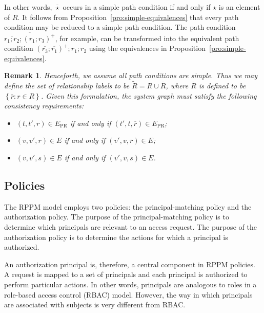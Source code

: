 \documentclass{article}
\newtheorem{remark}{Remark}
\newcommand{\set}[1]{\ensuremath{\left\{#1\right\}}} \newcommand{\setO}[1]{\ensuremath{\left\{#1\right.}} \newcommand{\setC}[1]{\ensuremath{\left.#1\right\}}} \newcommand{\setN}[1]{\ensuremath{\left.#1\right.}} \newcommand{\sett}[1]{\ensuremath{\left\{\textit{#1}\right\}}} \newcommand{\tuple}[1]{\ensuremath{\left(#1\right)}} \newcommand{\tuplet}[1]{\ensuremath{\left(\textit{#1}\right)}} \newcommand{\card}[1]{\left| #1 \right|}
\newcommand{\RcoR}{\ensuremath{\widetilde{R}}} \newcommand{\entity}[1]{\ensuremath{#1}} \newcommand{\rel}[1]{\ensuremath{#1}} \newcommand{\relw}[1]{\textsf{#1}} \newcommand{\comp}{\mathbin{;}} \newcommand{\relpc}[1]{\textsf{#1}} \newcommand{\princ}[1]{\textsf{#1}} \newcommand{\ppmc}{\ensuremath{\phi}} \newcommand{\npmc}{\ensuremath{\psi}} \newcommand{\pmp}{\ensuremath{\rho}} \newcommand{\act}[1]{\textsf{#1}} \newcommand{\crs}{\ensuremath{\chi}} \newcommand{\crso}[1]{\textsf{#1}} \newcommand{\defo}[1]{#1} \newcommand{\mpalg}{\textsf{MatchPrincipal}\xspace} \renewcommand{\algorithmiccomment}[1]{// #1} \newcommand{\audita}[1]{\ensuremath{#1^\oplus}}
\begin{document}
In other words, $\overline{\star}$ occurs in a simple path condition if and only if $\star$ is an element of $R$.
It follows from Proposition~\ref{pro:simple-equivalences} that every path condition may be reduced to a simple path condition.
The path condition $\overline{\overline{r_1 \comp r_2} \comp (r_1 \comp r_3)^+}$, for example, can be transformed into the equivalent path condition $(\overline{r_3} \comp \overline{r_1})^+ \comp r_1 \comp r_2$ using the equivalences in Proposition~\ref{pro:simple-equivalences}.

\begin{remark}\label{rem:r-includes-rbar}
    Henceforth, we assume all path conditions are simple.
    Thus we may define the set of relationship labels to be $\RcoR = R \cup \overline{R}$, where $\overline{R}$ is defined to be $\set{\overline{r} : r \in R}$.
    Given this formulation, the system graph must satisfy the following consistency requirements:
    \begin{itemize}
     \item $(t,t',r) \in E_{\textrm{PR}}$ if and only if $(t',t,\overline{r}) \in E_{\textrm{PR}}$;
     \item $(v,v',r) \in E$ if and only if $(v',v,\overline{r}) \in E$;
     \item $(v,v',s) \in E$ if and only if $(v',v,s) \in E$.
    \end{itemize}
\end{remark}

\subsection{Policies}\label{sec:model:policies}

\newcommand{\all}{\mathsf{all}}
\newcommand{\none}{\mathsf{none}}

The RPPM model employs two policies: the principal-matching policy and the authorization policy.
The purpose of the principal-matching policy is to determine which principals are relevant to an access request.
The purpose of the authorization policy is to determine the actions for which a principal is authorized.

An authorization principal is, therefore, a central component in RPPM policies.
A request is mapped to a set of principals and each principal is authorized to perform particular actions.
In other words, principals are analogous to roles in a role-based access control (RBAC) model.
However, the way in which principals are associated with subjects is very different from RBAC.
\end{document}
